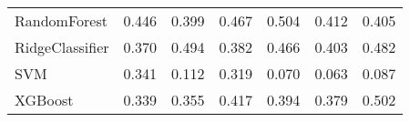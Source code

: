 \begin{tabular}{lllllll}
                   RandomForest & 0.446 &                     0.399 &                 0.467 &                  0.504 &                                   0.412 &    0.405 \\
                RidgeClassifier & 0.370 &                     0.494 &                 0.382 &                  0.466 &                                   0.403 &    0.482 \\
                            SVM & 0.341 &                     0.112 &                 0.319 &                  0.070 &                                   0.063 &    0.087 \\
                        XGBoost & 0.339 &                     0.355 &                 0.417 &                  0.394 &                                   0.379 &    0.502 \\
\bottomrule
\end{tabular}
